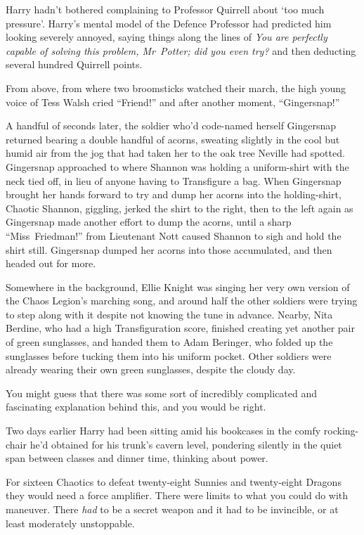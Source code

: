 Harry hadn’t bothered complaining to Professor Quirrell about ‘too much pressure’. Harry’s mental model of the Defence Professor had predicted him looking severely annoyed, saying things along the lines of \emph{You are perfectly capable of solving this problem, Mr~Potter; did you even try?} and then deducting several hundred Quirrell points.

From above, from where two broomsticks watched their march, the high young voice of Tess Walsh cried “Friend!” and after another moment, “Gingersnap!”

A handful of seconds later, the soldier who’d code-named herself Gingersnap returned bearing a double handful of acorns, sweating slightly in the cool but humid air from the jog that had taken her to the oak tree Neville had spotted. Gingersnap approached to where Shannon was holding a uniform-shirt with the neck tied off, in lieu of anyone having to Transfigure a bag. When Gingersnap brought her hands forward to try and dump her acorns into the holding-shirt, Chaotic Shannon, giggling, jerked the shirt to the right, then to the left again as Gingersnap made another effort to dump the acorns, until a sharp “Miss~Friedman!” from Lieutenant Nott caused Shannon to sigh and hold the shirt still. Gingersnap dumped her acorns into those accumulated, and then headed out for more.

Somewhere in the background, Ellie Knight was singing her very own version of the Chaos Legion’s marching song, and around half the other soldiers were trying to step along with it despite not knowing the tune in advance. Nearby, Nita Berdine, who had a high Transfiguration score, finished creating yet another pair of green sunglasses, and handed them to Adam Beringer, who folded up the sunglasses before tucking them into his uniform pocket. Other soldiers were already wearing their own green sunglasses, despite the cloudy day.

You might guess that there was some sort of incredibly complicated and fascinating explanation behind this, and you would be right.

Two days earlier Harry had been sitting amid his bookcases in the comfy rocking-chair he’d obtained for his trunk’s cavern level, pondering silently in the quiet span between classes and dinner time, thinking about power.

For sixteen Chaotics to defeat twenty-eight Sunnies and twenty-eight Dragons they would need a force amplifier. There were limits to what you could do with maneuver. There \emph{had} to be a secret weapon and it had to be invincible, or at least moderately unstoppable.

